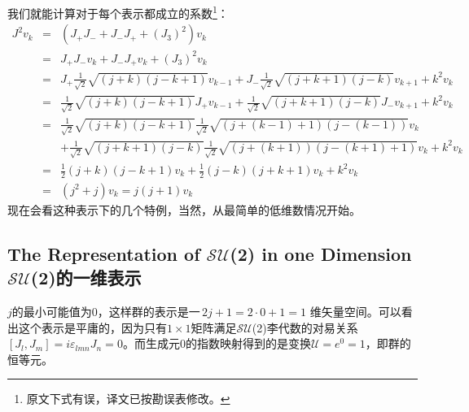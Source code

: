 我们就能计算对于每个表示都成立的系数\footnote{原文下式有误，译文已按勘误表修改。}：
\begin{eqnarray}
  \nonumber  J^2 v_k&=&(J_+J_- + J_-J_+ +(J_3)^2)v_k \\
  \nonumber         &=&J_+J_-v_k + J_-J_+v_k +(J_3)^2v_k \\
  \nonumber         &=& J_+ \frac{1}{\sqrt{2}}\sqrt{(j+k)(j-k+1)} v_{k-1}+J_-\frac{1}{\sqrt{2}}\sqrt{(j+k+1)(j-k)} v_{k+1} +k^2v_k  \\
  \nonumber         &=& \frac{1}{\sqrt{2}}\sqrt{(j+k)(j-k+1)} J_+v_{k-1}+\frac{1}{\sqrt{2}}\sqrt{(j+k+1)(j-k)}J_- v_{k+1} +k^2v_k  \\
  \nonumber         &=& \frac{1}{\sqrt{2}}\sqrt{(j+k)(j-k+1)}   \frac{1}{\sqrt{2}}  \sqrt{(j+(k-1)+1)(j-(k-1))}v_{k}   \\
  \nonumber          && +\frac{1}{\sqrt{2}}\sqrt{(j+k+1)(j-k)} \frac{1}{\sqrt{2}} \sqrt{(j+(k+1))(j-(k+1)+1)} v_{k} +k^2v_k  \\
   \nonumber        &=&\frac{1}{2}(j+k)(j-k+1)v_k +\frac{1}{2}(j-k)(j+k+1)v_k+k^2v_k\\
\label{equ3.112}
                    &=&(j^2+j)v_k=j(j+1)v_k
\end{eqnarray}
现在会看这种表示下的几个特例，当然，从最简单的低维数情况开始。

\subsection[$\mathcal{SU}$(2)的一维表示]{The Representation of $\mathcal{SU}$(2) in one Dimension $\mathcal{SU}$(2)的一维表示}
\label{sec3.6.3}
$j$的最小可能值为0，这样群的表示是一$\,2j+1=2 \cdot 0+1=1$ 维矢量空间。可以看出这个表示是平庸的，因为只有$1 \times 1$矩阵满足$\mathcal{SU}$(2)李代数的对易关系$[J_l,J_m]=i\varepsilon_{lmn} J_n=0$。而生成元0的指数映射得到的是变换$\mathcal{U}=e^0=1$，即群的恒等元。

